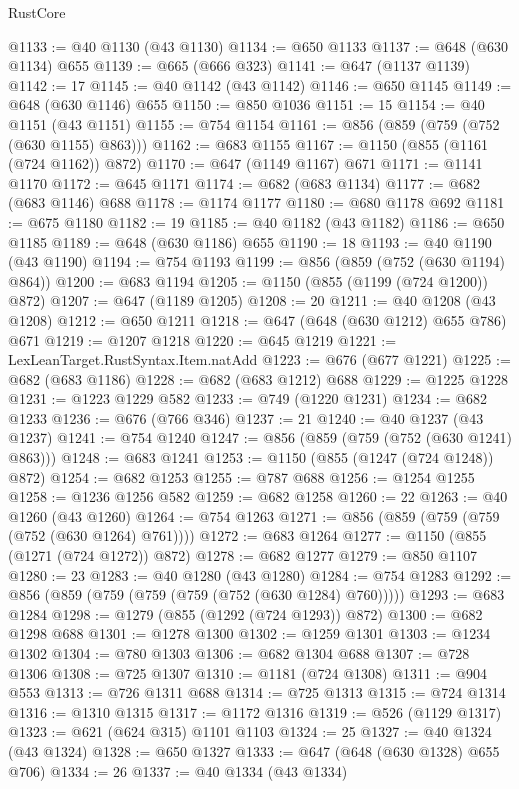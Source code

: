 \begin{lexlean}{RustCore}
\begin{coremodule}
@1133 := @40 @1130 (@43 @1130)
@1134 := @650 @1133
@1137 := @648 (@630 @1134) @655
@1139 := @665 (@666 @323)
@1141 := @647 (@1137 @1139)
@1142 := 17
@1145 := @40 @1142 (@43 @1142)
@1146 := @650 @1145
@1149 := @648 (@630 @1146) @655
@1150 := @850 @1036
@1151 := 15
@1154 := @40 @1151 (@43 @1151)
@1155 := @754 @1154
@1161 := @856 (@859 (@759 (@752 (@630 @1155) @863)))
@1162 := @683 @1155
@1167 := @1150 (@855 (@1161 (@724 @1162)) @872)
@1170 := @647 (@1149 @1167) @671
@1171 := @1141 @1170
@1172 := @645 @1171
@1174 := @682 (@683 @1134)
@1177 := @682 (@683 @1146) @688
@1178 := @1174 @1177
@1180 := @680 @1178 @692
@1181 := @675 @1180
@1182 := 19
@1185 := @40 @1182 (@43 @1182)
@1186 := @650 @1185
@1189 := @648 (@630 @1186) @655
@1190 := 18
@1193 := @40 @1190 (@43 @1190)
@1194 := @754 @1193
@1199 := @856 (@859 (@752 (@630 @1194) @864))
@1200 := @683 @1194
@1205 := @1150 (@855 (@1199 (@724 @1200)) @872)
@1207 := @647 (@1189 @1205)
@1208 := 20
@1211 := @40 @1208 (@43 @1208)
@1212 := @650 @1211
@1218 := @647 (@648 (@630 @1212) @655 @786) @671
@1219 := @1207 @1218
@1220 := @645 @1219
@1221 := LexLeanTarget.RustSyntax.Item.natAdd
@1223 := @676 (@677 @1221)
@1225 := @682 (@683 @1186)
@1228 := @682 (@683 @1212) @688
@1229 := @1225 @1228
@1231 := @1223 @1229 @582
@1233 := @749 (@1220 @1231)
@1234 := @682 @1233
@1236 := @676 (@766 @346)
@1237 := 21
@1240 := @40 @1237 (@43 @1237)
@1241 := @754 @1240
@1247 := @856 (@859 (@759 (@752 (@630 @1241) @863)))
@1248 := @683 @1241
@1253 := @1150 (@855 (@1247 (@724 @1248)) @872)
@1254 := @682 @1253
@1255 := @787 @688
@1256 := @1254 @1255
@1258 := @1236 @1256 @582
@1259 := @682 @1258
@1260 := 22
@1263 := @40 @1260 (@43 @1260)
@1264 := @754 @1263
@1271 := @856 (@859 (@759 (@759 (@752 (@630 @1264) @761))))
@1272 := @683 @1264
@1277 := @1150 (@855 (@1271 (@724 @1272)) @872)
@1278 := @682 @1277
@1279 := @850 @1107
@1280 := 23
@1283 := @40 @1280 (@43 @1280)
@1284 := @754 @1283
@1292 := @856 (@859 (@759 (@759 (@759 (@752 (@630 @1284) @760)))))
@1293 := @683 @1284
@1298 := @1279 (@855 (@1292 (@724 @1293)) @872)
@1300 := @682 @1298 @688
@1301 := @1278 @1300
@1302 := @1259 @1301
@1303 := @1234 @1302
@1304 := @780 @1303
@1306 := @682 @1304 @688
@1307 := @728 @1306
@1308 := @725 @1307
@1310 := @1181 (@724 @1308)
@1311 := @904 @553
@1313 := @726 @1311 @688
@1314 := @725 @1313
@1315 := @724 @1314
@1316 := @1310 @1315
@1317 := @1172 @1316
@1319 := @526 (@1129 @1317)
@1323 := @621 (@624 @315) @1101 @1103
@1324 := 25
@1327 := @40 @1324 (@43 @1324)
@1328 := @650 @1327
@1333 := @647 (@648 (@630 @1328) @655 @706)
@1334 := 26
@1337 := @40 @1334 (@43 @1334)

\end{coremodule}
\end{lexlean}
